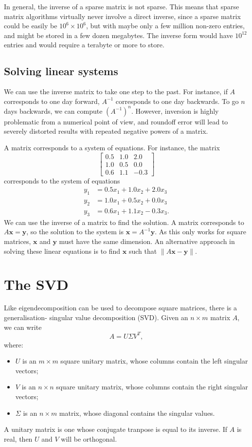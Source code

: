 \documentclass[a4paper, openany]{memoir}
\begin{document}
    In general, the inverse of a sparse matrix is not sparse. This means that sparse matrix algorithms virtually never involve a direct inverse, since a sparse matrix could be easily be $10^6 \times 10^6$, but with maybe only a few million non-zero entries, and might be stored in a few dozen megabytes. The inverse form would have $10^{12}$ entries and would require a terabyte or more to store.

    \subsection{Solving linear systems}
    We can use the inverse matrix to take one step to the past. For instance, if $A$ corresponds to one day forward, $A^{-1}$ corresponds to one day backwards. To go $n$ days backwards, we can compute $(A^{-1})^n$. However, inversion is highly problematic from a numerical point of view, and roundoff error will lead to severely distorted results with repeated negative powers of a matrix.

    A matrix corresponds to a system of equations. For instance, the matrix 
    \[\begin{bmatrix}
        0.5 & 1.0 & 2.0 \\
        1.0 & 0.5 & 0.0 \\
        0.6 & 1.1 & -0.3
    \end{bmatrix}\]
    corresponds to the system of equations 
    \begin{align*}
        y_1 &= 0.5x_1 + 1.0x_2 + 2.0x_3 \\
        y_2 &= 1.0x_1 + 0.5x_2 + 0.0x_3 \\
        y_3 &= 0.6x_1 + 1.1x_2 - 0.3x_3.
    \end{align*}
    We can use the inverse of a matrix to find the solution. A matrix corresponds to $A \mathbf{x} = \mathbf{y}$, so the solution to the system is $\mathbf{x} = A^{-1} \mathbf{y}$. As this only works for square matrices, $\mathbf{x}$ and $\mathbf{y}$ must have the same dimension. An alternative approach in solving these linear equations is to find $\mathbf{x}$ such that $\lVert A \mathbf{x} - \mathbf{y} \rVert$.
    \newpage

    \section{The SVD}
    Like eigendecomposition can be used to decompose square matrices, there is a generalisation- singular value decomposition (SVD). Given an $n \times m$ matrix $A$, we can write
    \[A = U \Sigma V^T,\]
    where:
    \begin{itemize}
        \item $U$ is an $m \times m$ square unitary matrix, whose columns contain the left singular vectors;
        \item $V$ is an $n \times n$ square unitary matrix, whose columns contain the right singular vectors;
        \item $\Sigma$ is an $n \times m$ matrix, whose diagonal contains the singular values.
    \end{itemize}
    A unitary matrix is one whose conjugate tranpose is equal to its inverse. If $A$ is real, then $U$ and $V$ will be orthogonal.
\end{document}

